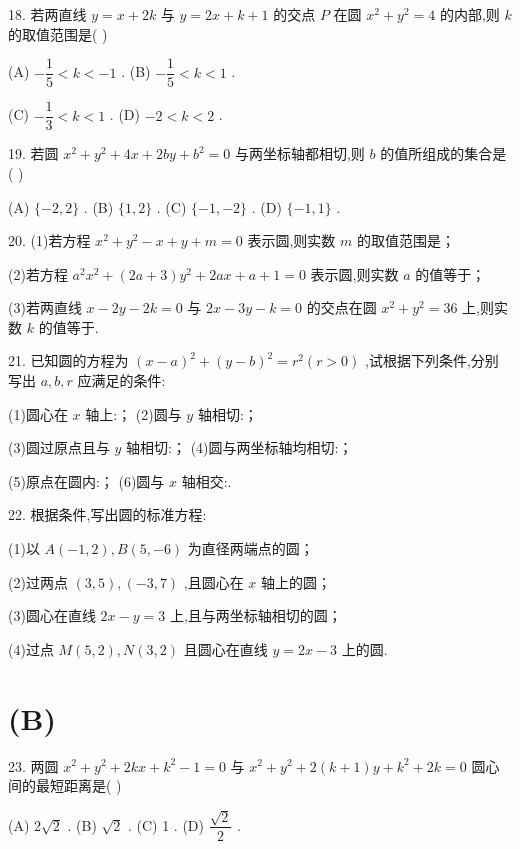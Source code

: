 18. 若两直线 $y = x + {2k}$ 与 $y = {2x} + k + 1$ 的交点 $P$ 在圆 ${x}^{2} + {y}^{2} = 4$ 的内部,则 $k$ 的取值范围是(   )

(A) $- \dfrac{1}{5} < k <  - 1$ . (B) $- \dfrac{1}{5} < k < 1$ .

(C) $- \dfrac{1}{3} < k < 1$ . (D) $- 2 < k < 2$ .

19. 若圆 ${x}^{2} + {y}^{2} + {4x} + {2by} + {b}^{2} = 0$ 与两坐标轴都相切,则 $b$ 的值所组成的集合是 (   )

(A) $\{  - 2,2\}$ . (B) $\{ 1,2\}$ . (C) $\{  - 1, - 2\}$ . (D) $\{  - 1,1\}$ .

20. (1)若方程 ${x}^{2} + {y}^{2} - x + y + m = 0$ 表示圆,则实数 $m$ 的取值范围是\blkda{}；

(2)若方程 ${a}^{2}{x}^{2} + \left( {{2a} + 3}\right) {y}^{2} + {2ax} + a + 1 = 0$ 表示圆,则实数 $a$ 的值等于\blkda{}；

(3)若两直线 $x - {2y} - {2k} = 0$ 与 ${2x} - {3y} - k = 0$ 的交点在圆 ${x}^{2} + {y}^{2} = {36}$ 上,则实数 $k$ 的值等于\blkda{}.

21. 已知圆的方程为 ${\left( x - a\right) }^{2} + {\left( y - b\right) }^{2} = {r}^{2}\left( {r > 0}\right)$ ,试根据下列条件,分别写出 $a,b,r$ 应满足的条件:

(1)圆心在 $x$ 轴上:\blkda{}； (2)圆与 $y$ 轴相切:\blkda{}；

(3)圆过原点且与 $y$ 轴相切:\blkda{}； (4)圆与两坐标轴均相切:\blkda{}；

(5)原点在圆内:\blkda{}； (6)圆与 $x$ 轴相交:\blkda{}.

22. 根据条件,写出圆的标准方程:

(1)以 $A\left( {-1,2}\right) ,B\left( {5, - 6}\right)$ 为直径两端点的圆；

(2)过两点 $\left( {3,5}\right) ,\left( {-3,7}\right)$ ,且圆心在 $x$ 轴上的圆；

(3)圆心在直线 ${2x} - y = 3$ 上,且与两坐标轴相切的圆；

(4)过点 $M\left( {5,2}\right) ,N\left( {3,2}\right)$ 且圆心在直线 $y = {2x} - 3$ 上的圆.

\section*{(B)}

23. 两圆 ${x}^{2} + {y}^{2} + {2kx} + {k}^{2} - 1 = 0$ 与 ${x}^{2} + {y}^{2} + 2\left( {k + 1}\right) y + {k}^{2} + {2k} = 0$ 圆心间的最短距离是(   )

(A) $2\sqrt{2}$ . (B) $\sqrt{2}$ . (C) 1 . (D) $\dfrac{\sqrt{2}}{2}$ .

